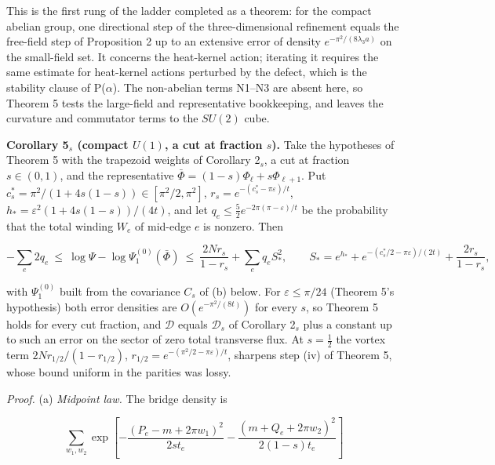 \documentclass[11pt,a4paper]{article}
\begin{document}
This is the first rung of the ladder completed as a theorem: for the
compact abelian group, one directional step of the three-dimensional
refinement equals the free-field step of Proposition 2 up to an
extensive error of density \(e^{-\pi^2/(8\lambda_3a)}\) on the
small-field set. It concerns the heat-kernel action; iterating it
requires the same estimate for heat-kernel actions perturbed by the
defect, which is the stability clause of P(\(\alpha\)). The non-abelian
terms N1--N3 are absent here, so Theorem 5 tests the large-field and
representative bookkeeping, and leaves the curvature and commutator
terms to the \(SU(2)\) cube.

\textbf{Corollary 5\(_s\) (compact \(U(1)\), a cut at fraction \(s\)).}
Take the hypotheses of Theorem 5 with the trapezoid weights of Corollary
2\(_s\), a cut at fraction \(s\in(0,1)\), and the representative
\(\bar\Phi=(1-s)\Phi_\ell+s\Phi_{\ell+1}\). Put
\(c^*_s=\pi^2/(1+4s(1-s))\in[\pi^2/2,\pi^2]\),
\(r_s=e^{-(c^*_s-\pi\varepsilon)/t}\),
\(h_*=\varepsilon^2(1+4s(1-s))/(4t)\), and let
\(q_e\le\frac52e^{-2\pi(\pi-\varepsilon)/t}\) be the probability that
the total winding \(W_e\) of mid-edge \(e\) is nonzero. Then

\[-\sum_e2q_e\ \le\ \log\Psi-\log\Psi_1^{(0)}(\bar\Phi)\ \le\
\frac{2Nr_s}{1-r_s}+\sum_eq_eS_*^2,\qquad
S_*=e^{h_*}+e^{-(c^*_s/2-\pi\varepsilon)/(2t)}+\frac{2r_s}{1-r_s},\]

with \(\Psi_1^{(0)}\) built from the covariance \(C_s\) of (b) below.
For \(\varepsilon\le\pi/24\) (Theorem 5's hypothesis) both error
densities are \(O(e^{-\pi^2/(8t)})\) for every \(s\), so Theorem 5 holds
for every cut fraction, and \(\mathcal D\) equals \(\mathcal D_s\) of
Corollary 2\(_s\) plus a constant up to such an error on the sector of
zero total transverse flux. At \(s=\frac12\) the vortex term
\(2Nr_{1/2}/(1-r_{1/2})\), \(r_{1/2}=e^{-(\pi^2/2-\pi\varepsilon)/t}\),
sharpens step (iv) of Theorem 5, whose bound uniform in the parities was
lossy.

\emph{Proof.} (a) \emph{Midpoint law.} The bridge density is

\[\sum_{w_1,w_2}\exp\!\left[-\frac{(P_e-m+2\pi w_1)^2}{2st_e}-\frac{(m+Q_e+2\pi w_2)^2}{2(1-s)t_e}\right]\]
\end{document}
